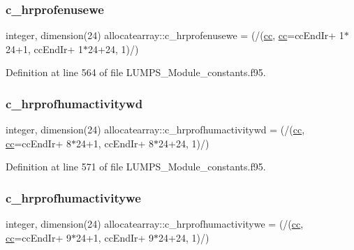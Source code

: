 \subsubsection{\texorpdfstring{c\+\_\+hrprofenusewe}{c\_hrprofenusewe}}
{\footnotesize\ttfamily integer, dimension(24) allocatearray\+::c\+\_\+hrprofenusewe = (/(\hyperlink{namespaceallocatearray_ac863c81704eb507dee10f5e10741e10c}{cc}, \hyperlink{namespaceallocatearray_ac863c81704eb507dee10f5e10741e10c}{cc}=cc\+End\+Ir+ 1$\ast$24+1, cc\+End\+Ir+ 1$\ast$24+24, 1)/)}



Definition at line 564 of file L\+U\+M\+P\+S\+\_\+\+Module\+\_\+constants.\+f95.

\mbox{\label{namespaceallocatearray_adf1fb00d1eea9cc75400669bc0428fae}} 
\subsubsection{\texorpdfstring{c\+\_\+hrprofhumactivitywd}{c\_hrprofhumactivitywd}}
{\footnotesize\ttfamily integer, dimension(24) allocatearray\+::c\+\_\+hrprofhumactivitywd = (/(\hyperlink{namespaceallocatearray_ac863c81704eb507dee10f5e10741e10c}{cc}, \hyperlink{namespaceallocatearray_ac863c81704eb507dee10f5e10741e10c}{cc}=cc\+End\+Ir+ 8$\ast$24+1, cc\+End\+Ir+ 8$\ast$24+24, 1)/)}



Definition at line 571 of file L\+U\+M\+P\+S\+\_\+\+Module\+\_\+constants.\+f95.

\mbox{\label{namespaceallocatearray_ab556a4e4364d70401d2935d489772462}} 
\subsubsection{\texorpdfstring{c\+\_\+hrprofhumactivitywe}{c\_hrprofhumactivitywe}}
{\footnotesize\ttfamily integer, dimension(24) allocatearray\+::c\+\_\+hrprofhumactivitywe = (/(\hyperlink{namespaceallocatearray_ac863c81704eb507dee10f5e10741e10c}{cc}, \hyperlink{namespaceallocatearray_ac863c81704eb507dee10f5e10741e10c}{cc}=cc\+End\+Ir+ 9$\ast$24+1, cc\+End\+Ir+ 9$\ast$24+24, 1)/)}




